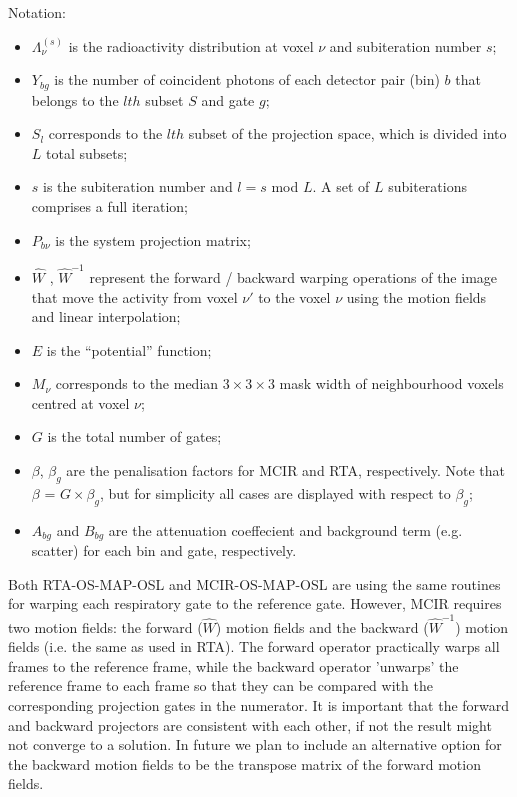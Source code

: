 \documentclass{article}
\begin{document}
Notation: 
\begin{itemize}
\item $\Lambda_{\nu}^{(s)}$ is the radioactivity distribution at voxel ${\nu}$ and subiteration number $s$;

\item $Y_{bg}$ is the number of coincident photons of each detector pair (bin) $b$ that belongs to the $lth$ subset $S$ and gate $g$;

\item $S_{l}$ corresponds to the $lth$ subset of the projection space, which is divided into $L$ total subsets;

\item $s$ is the subiteration number and $l = s$ mod $L$. A set of $L$ subiterations comprises a full iteration;

\item $P_{b\nu}$ is the system projection matrix;

\item $\hat{W}$ , $\hat{W}^{-1}$ represent the forward / backward warping operations of the image that move the activity from voxel $\nu'$ to the voxel $\nu$ using the motion fields and linear interpolation;

\item $E$ is the ``potential'' function;

\item $M_{\nu}$ corresponds to the median $3\times3\times3$ mask width of neighbourhood voxels centred at voxel $\nu$;

\item $G$ is the total number of gates;

\item $\beta$, $\beta_{g}$ are the penalisation factors for MCIR and RTA, respectively. Note that $\beta$ = $G\times\beta_{g}$, but for simplicity all cases are displayed with respect to $\beta_{g}$;

\item $A_{bg}$ and $B_{bg}$ are the attenuation coeffecient and background term (e.g. scatter) for each bin and gate, respectively.
\end{itemize}

Both RTA-OS-MAP-OSL and MCIR-OS-MAP-OSL are using the same routines for warping each respiratory gate to
the reference gate. However, MCIR requires two motion fields: the forward ($\hat{W}$) motion fields and the
backward ($\hat{W}^{-1}$) motion fields (i.e. the same as used in RTA). The forward operator practically warps all
frames to the reference frame, while the backward operator 'unwarps' the reference frame to each frame so
that they can be compared with the corresponding projection gates in the numerator. It is important that
the forward and backward projectors are consistent with each other, if not the result might not converge
to a solution. In future we plan to include an alternative option for the backward motion fields to be
the transpose matrix of the forward motion fields.
\end{document}

